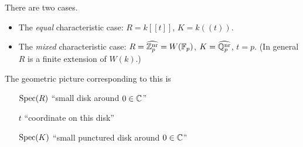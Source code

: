 \begin{example}
	There are two cases.
	\begin{itemize}
		\item The \emph{equal} characteristic case: $R = k[[t]]$, $K = k((t))$.
		\item The \emph{mixed} characteristic case: $R = \widehat{\mathbb{Z}_{p}^{\mathrm{nr}}} = W(\mathbb{F}_{p})$, $K = \widehat{\mathbb{Q}_{p}^{\mathrm{nr}}}$, $t = p$. (In general $R$ is a finite extension of $W(k)$.)
	\end{itemize}
\end{example}
The geometric picture corresponding to this is
\begin{itemize}
	\item[$\mathrm{Spec}(R)$] ``small disk around $0 \in \mathbb{C}$''
	\item[$t$] ``coordinate on this disk''
	\item[$\mathrm{Spec}(K)$] ``small punctured disk around $0 \in \mathbb{C}$''
\end{itemize}

